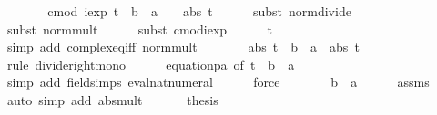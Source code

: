 \documentclass[leqno]{article}
\theoremstyle{definition}
\begin{document}
\begin{isabellebody}
\ \ \isamarkupfalse%
\ \isamarkupfalse%
\ {\isachardoublequoteopen}{\isasymdots}\ {\isacharequal}\ cmod\ {\isacharparenleft}iexp\ {\isacharparenleft}t\ {\isacharasterisk}\ {\isacharparenleft}b\ {\isacharminus}\ a{\isacharparenright}{\isacharparenright}\ {\isacharminus}\ {}{\isacharparenright}\ {\isacharslash}\ abs\ t{\isachardoublequoteclose}\isanewline
\ \ \ \ \isamarkupfalse%
\ {\isacharparenleft}subst\ norm{\isacharunderscore}divide{\isacharparenright}\isanewline
\ \ \ \ \isamarkupfalse%
\ {\isacharparenleft}subst\ norm{\isacharunderscore}mult{\isacharparenright}\isanewline
\ \ \ \ \isamarkupfalse%
\ {\isacharparenleft}subst\ cmod{\isacharunderscore}iexp{\isacharparenright}\isanewline
\ \ \ \ \isamarkupfalse%
\ {\isacharbackquoteopen}t\ {\isasymnoteq}\ {}{\isacharbackquoteclose}\ \isamarkupfalse%
\ {\isacharparenleft}simp\ add{\isacharcolon}\ complex{\isacharunderscore}eq{\isacharunderscore}iff\ norm{\isacharunderscore}mult{\isacharparenright}\isanewline
\ \ \isamarkupfalse%
\ \isamarkupfalse%
\ {\isachardoublequoteopen}{\isasymdots}\ {\isasymle}\ abs\ {\isacharparenleft}t\ {\isacharasterisk}\ {\isacharparenleft}b\ {\isacharminus}\ a{\isacharparenright}{\isacharparenright}\ {\isacharslash}\ abs\ t{\isachardoublequoteclose}\isanewline
\ \ \ \ \isamarkupfalse%
\ {\isacharparenleft}rule\ divide{\isacharunderscore}right{\isacharunderscore}mono{\isacharparenright}\isanewline
\ \ \ \ \isamarkupfalse%
\ equation{\isacharunderscore}{}{}p{}a\ {\isacharbrackleft}of\ {\isachardoublequoteopen}t\ {\isacharasterisk}\ {\isacharparenleft}b\ {\isacharminus}\ a{\isacharparenright}{\isachardoublequoteclose}\ {}{\isacharbrackright}\ \isamarkupfalse%
\ {\isacharparenleft}simp\ add{\isacharcolon}\ field{\isacharunderscore}simps\ eval{\isacharunderscore}nat{\isacharunderscore}numeral{\isacharparenright}\isanewline
\ \ \ \ \isamarkupfalse%
\ force\isanewline
\ \ \isamarkupfalse%
\ \isamarkupfalse%
\ {\isachardoublequoteopen}{\isasymdots}\ {\isacharequal}\ b\ {\isacharminus}\ a{\isachardoublequoteclose}\isanewline
\ \ \ \ \isamarkupfalse%
\ assms\ \isamarkupfalse%
\ {\isacharparenleft}auto\ simp\ add{\isacharcolon}\ abs{\isacharunderscore}mult{\isacharparenright}\ \isanewline
\ \ \isamarkupfalse%
\ \isamarkupfalse%
\ {\isacharquery}thesis\ \isacommand{{\isachardot}}\isamarkupfalse%
\isanewline
{}
\end{isabellebody}
\end{document}
